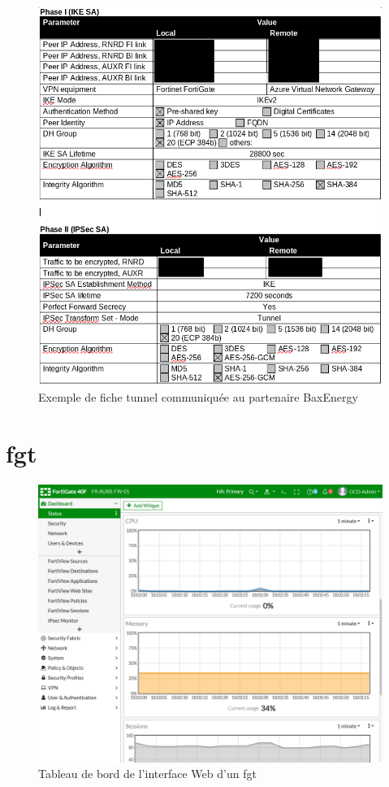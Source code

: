 \documentclass[12pt, oneside, a4paper, titlepage]{report}
\begin{document}
\begin{figure}[h!]
    \centering
    \includegraphics[width = \linewidth]{img/doc-hy/ipsec-tun.png}
    \caption{Exemple de fiche tunnel communiquée au partenaire BaxEnergy}%
    \label{fig:doc-hy/ipsec-tun}
\end{figure}

\section{\acrlong{fgt}}%
\label{sec:annexes::fgt}

\begin{figure}[h!]
    \centering
    \includegraphics[width = \linewidth]{img/fgt-auxr/dashboard.png}
    \caption{Tableau de bord de l'interface Web d'un \acrlong{fgt}}%
    \label{fig:fgt-auxr/dashboard.png}
\end{figure}
\end{document}
